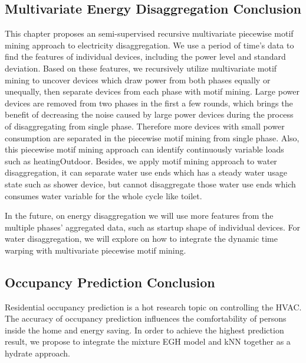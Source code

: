 \subsection{Multivariate Energy Disaggregation Conclusion}
This chapter proposes an semi-supervised recursive multivariate piecewise motif mining approach 
to electricity disaggregation. 
We use a period of time's data to find the features of individual devices, 
including the power level and standard deviation.
Based on these features, 
we recursively utilize multivariate motif mining to uncover devices 
which draw power from both phases equally or unequally, 
then separate devices from each phase with motif mining. 
Large power devices are removed from two phases in the first a few rounds, 
which brings the benefit of decreasing the noise caused by large power devices 
during the process of disaggregating from single phase. 
Therefore more devices with small power consumption are separated 
in the piecewise motif mining from single phase. 
Also, this piecewise motif mining approach can identify
continuously variable loads such as heatingOutdoor. 
Besides, we apply motif mining approach to water disaggregation, 
it can separate water use ends which has a steady water usage state such as shower device, 
but cannot disaggregate those water use ends which consumes water variable for the whole 
cycle like toilet. 

In the future, 
on energy disaggregation we will use more features from the multiple phases' aggregated data, 
such as startup shape of individual devices.
For water disaggregation, we will explore on how to integrate the 
dynamic time warping with multivariate piecewise motif mining. 

\subsection{Occupancy Prediction Conclusion}
Residential occupancy prediction is a hot research topic on controlling the HVAC. 
The accuracy of occupancy prediction influences the comfortability of persons inside 
the home and energy saving. 
In order to achieve the highest prediction result, 
we propose to integrate the mixture EGH model and 
kNN together as a hydrate approach.


